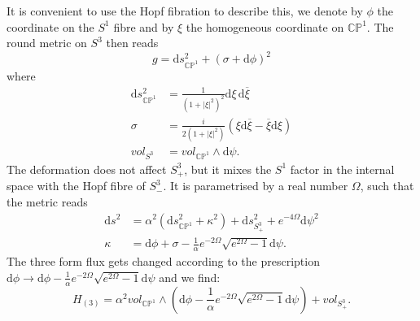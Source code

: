 \documentclass[a4paper, 11pt]{article}
\numberwithin{equation}{section}
\newcommand{\ov}[1]{\overline{#1}}
\newcommand{\+}{\oplus}
\renewcommand{\d}{\ensuremath{\mathrm{d}}\xspace}
\begin{document}
It is convenient to use the Hopf fibration to describe this, we denote by $\phi$ the coordinate on the $S^1$ fibre and by $\xi$ the homogeneous coordinate on $\mathbb{CP}^1$. The round metric on $S^3$ then reads
\begin{equation}
	g= \mathrm{d}s^2_{\mathbb{CP}^1} + (\sigma + \mathrm{d}\phi)^2
\end{equation}
where 
\begin{equation}
	\begin{split}
		\mathrm{d}s^2_{\mathbb{CP}^1} &= \frac1{(1+|\xi|^2)^2}\mathrm{d}\xi\,\mathrm{ d}\ov{\xi}\\
		\sigma&=\frac{i}{2(1+|\xi|^2)}(\xi \mathrm{d} \ov{\xi}-\ov{\xi}\mathrm{d}\xi)\\ 
		vol_{S^3}&=vol_{\mathbb{CP}^1}\wedge \mathrm{d}\psi .
	\end{split}
\end{equation}
The deformation does not affect $S_+^3$, but it mixes the $S^1$ factor in the internal space with the Hopf fibre of $S_-^3$. It is parametrised by a real number $\Omega$, such that the metric reads
\begin{equation}
	\begin{split}
		\mathrm{d}s^2 &= \alpha^2(\mathrm{d}s^2_{\mathbb{CP}^1}+\kappa^2) + \mathrm{d}s^2_{S_+^3} + e^{-4\Omega}\mathrm{d}\psi^2\\
		\kappa &= \mathrm{d}\phi + \sigma - \frac1{\alpha}e^{-2\Omega}\sqrt{e^{2\Omega}-1}\d\psi.
	\end{split}
\end{equation}
 The three form flux gets changed according to the prescription $\d\phi \rightarrow \d\phi -  \frac1{\alpha}e^{-2\Omega}\sqrt{e^{2\Omega}-1}\d \psi$ and we find:
\begin{equation}
	H_{(3)}=\alpha^2vol_{\mathbb{CP}^1}\wedge (\d\phi - \frac1{\alpha}e^{-2\Omega}\sqrt{e^{2\Omega}-1}\d\psi) + vol_{S_+^3}.
\end{equation}

%
\end{document}
